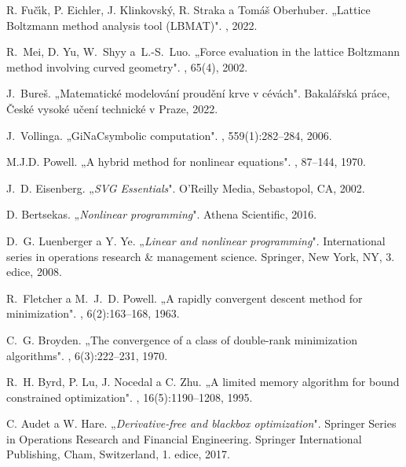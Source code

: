 \begin{thebibliography}{10}
	R. Fu{\v{c}}{\'{\i}}k, P. Eichler, J. Klinkovsk{\'{y}}, R. Straka
	a Tom{\'{a}}{\v{s}} Oberhuber.
	\newblock „{L}attice Boltzmann method analysis tool ({LBMAT})".
	, 2022.
	
	R.~Mei{,} D. Yu{,} W.~Shyy a~L.-S.~Luo.
	\newblock „{F}orce evaluation in the lattice Boltzmann method involving
	curved geometry".
	, 65(4), 2002.
	
	J.~Bureš.
	\newblock „Matematické modelování proudění krve v cévách".
	\newblock Bakalářská práce, České vysoké učení technické v Praze,  2022.
	
	J.~Vollinga.
	\newblock „{GiNaC}{\textemdash}symbolic computation".
	,
	559(1):282--284, 2006.
	
	M.J.D. Powell.
	\newblock „{A} hybrid method for nonlinear equations".
	,
	87–144, 1970.
	
	J.~D. Eisenberg.
	\newblock „{\em {SVG} Essentials}".
	\newblock O'Reilly Media, Sebastopol, CA, 2002.
	
	D. Bertsekas.
	\newblock „{\em Nonlinear programming}".
	\newblock Athena Scientific, 2016.
	
	D.~G. Luenberger a Y. Ye.
	\newblock „{\em Linear and nonlinear programming}".
	\newblock International series in operations research \& management science.
	Springer, New York, NY, 3. edice, 2008.
	
	R.~Fletcher a M.~J.~D. Powell.
	\newblock „{A} rapidly convergent descent method for minimization".
	, 6(2):163--168, 1963.
	
	C.~G. Broyden.
	\newblock „{T}he convergence of a class of double-rank minimization algorithms".
	, 6(3):222--231, 1970.
	
	R.~H. Byrd, P. Lu, J. Nocedal a C. Zhu.
	\newblock „{A} limited memory algorithm for bound constrained optimization".
	, 16(5):1190--1208,
	1995.
	
	C. Audet a W. Hare.
	\newblock „{\em Derivative-free and blackbox optimization}".
	\newblock Springer Series in Operations Research and Financial Engineering.
	Springer International Publishing, Cham, Switzerland, 1. edice, 2017.
	

\end{thebibliography}
